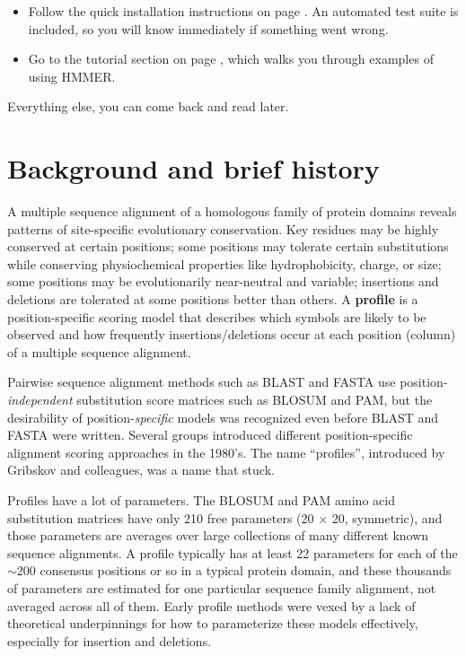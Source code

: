\begin{itemize}

\item Follow the quick installation instructions on page
  \pageref{chapter:installation}. An automated test suite is included,
  so you will know immediately if something went
  wrong.

\item Go to the tutorial section on page \pageref{chapter:tutorial},
  which walks you through examples of using HMMER.

\end{itemize}

Everything else, you can come back and read later.



\section{Background and brief history}

A multiple sequence alignment of a homologous family of protein
domains reveals patterns of site-specific evolutionary
conservation. Key residues may be highly conserved at certain
positions; some positions may tolerate certain substitutions while
conserving physiochemical properties like hydrophobicity, charge, or
size; some positions may be evolutionarily near-neutral and variable;
insertions and deletions are tolerated at some positions better than
others.  A \textbf{profile} is a position-specific scoring model that
describes which symbols are likely to be observed and how frequently
insertions/deletions occur at each position (column) of a
multiple sequence alignment.

Pairwise sequence alignment methods such as BLAST and FASTA use
position-\emph{independent} substitution score matrices such as BLOSUM
and PAM, but the desirability of position-\emph{specific} models was
recognized even before BLAST and FASTA were written.\cite{Doolittle81}
Several groups introduced different position-specific alignment
scoring approaches in the 1980's. The name ``profiles'', introduced by
Gribskov and colleagues,\cite{Gribskov87} was a name that stuck.

Profiles have a lot of parameters.  The BLOSUM and PAM amino acid
substitution matrices have only 210 free parameters (20 $\times$ 20,
symmetric), and those parameters are averages over large collections
of many different known sequence alignments. A profile typically has
at least 22 parameters  for each of the $\sim$200 consensus positions or so in a
typical protein domain, and these thousands of parameters are
estimated for one particular sequence family alignment, not averaged
across all of them. Early profile methods were vexed by a lack of
theoretical underpinnings for how to parameterize these models
effectively, especially for insertion and deletions.

